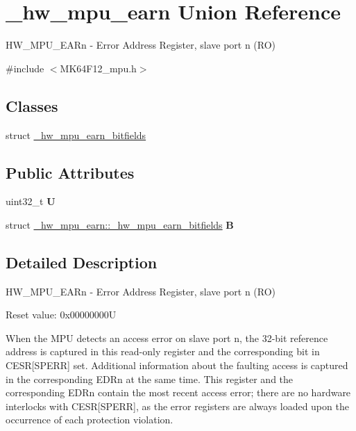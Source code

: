 \hypertarget{union__hw__mpu__earn}{}\section{\+\_\+hw\+\_\+mpu\+\_\+earn Union Reference}
\label{union__hw__mpu__earn}


H\+W\+\_\+\+M\+P\+U\+\_\+\+E\+A\+Rn -\/ Error Address Register, slave port n (RO)  




{\ttfamily \#include $<$M\+K64\+F12\+\_\+mpu.\+h$>$}

\subsection*{Classes}
\begin{DoxyCompactItemize}
\item 
struct \hyperlink{struct__hw__mpu__earn_1_1__hw__mpu__earn__bitfields}{\+\_\+hw\+\_\+mpu\+\_\+earn\+\_\+bitfields}
\end{DoxyCompactItemize}
\subsection*{Public Attributes}
\begin{DoxyCompactItemize}
\item 
uint32\+\_\+t {\bfseries U}\hypertarget{union__hw__mpu__earn_a7092b64e966bfccee429250cefb1a183}{}\label{union__hw__mpu__earn_a7092b64e966bfccee429250cefb1a183}

\item 
struct \hyperlink{struct__hw__mpu__earn_1_1__hw__mpu__earn__bitfields}{\+\_\+hw\+\_\+mpu\+\_\+earn\+::\+\_\+hw\+\_\+mpu\+\_\+earn\+\_\+bitfields} {\bfseries B}\hypertarget{union__hw__mpu__earn_ab9ab8e73b68420101192c5d8bb59c410}{}\label{union__hw__mpu__earn_ab9ab8e73b68420101192c5d8bb59c410}

\end{DoxyCompactItemize}


\subsection{Detailed Description}
H\+W\+\_\+\+M\+P\+U\+\_\+\+E\+A\+Rn -\/ Error Address Register, slave port n (RO) 

Reset value\+: 0x00000000U

When the M\+PU detects an access error on slave port n, the 32-\/bit reference address is captured in this read-\/only register and the corresponding bit in C\+E\+SR\mbox{[}S\+P\+E\+RR\mbox{]} set. Additional information about the faulting access is captured in the corresponding E\+D\+Rn at the same time. This register and the corresponding E\+D\+Rn contain the most recent access error; there are no hardware interlocks with C\+E\+SR\mbox{[}S\+P\+E\+RR\mbox{]}, as the error registers are always loaded upon the occurrence of each protection violation. 

